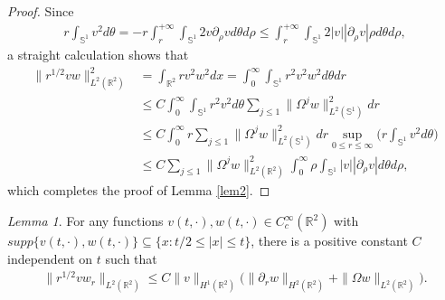 \documentclass[11pt, reqno]{amsart}
\theoremstyle{definition}
\theoremstyle{remark}
\newtheorem{lem}[thm]{Lemma}
\theoremstyle{definition}
\numberwithin{equation}{section}
\numberwithin{equation}{section}
\def\leq{\leqslant}
\begin{document}
\begin{proof}
Since
\begin{align}\label{a1}
r\int_{\mathbb S^1}v^2d\theta=-r\int_r^{+\infty}\int_{\mathbb S^1}2v\partial_{\rho}vd\theta d\rho\leq \int_r^{+\infty}\int_{\mathbb 
S^1}2|v||\partial_{\rho}v|\rho d\theta d\rho,
\end{align}
 a straight calculation shows that
\begin{align*}
\|r^{1/2}vw\|^2_{L^2(\mathbb R^2)}&=\int_{\mathbb
R^2}rv^2w^2dx=\int_0^{\infty}\int_{\mathbb S^1}r^2v^2w^2d\theta dr
\\&\leq C\int_0^{\infty}\int_{\mathbb S^1}r^2v^2d\theta\sum_{j\leq1}\|\Omega^jw\|^2_{L^2(\mathbb S^1)}dr
\\&\leq C\int_0^{\infty}r\sum_{j\leq1}\|\Omega^jw\|^2_{L^2(\mathbb S^1)}dr\sup_{0\leq r\leq\infty}\Big(r\int_{\mathbb S^1}v^2d\theta\Big)
\\&\leq C\sum_{j\leq1}\|\Omega^jw\|^2_{L^2(\mathbb R^2)}\int_0^{\infty}\rho\int_{\mathbb S^1}|v||\partial_{\rho}v|d\theta d\rho,
\end{align*}
which completes the proof of Lemma \ref{lem2}.
\end{proof}
\begin{lem}\label{lem3}
For any functions $v(t,\cdot),w(t,\cdot)\in C_c^{\infty}(\mathbb R^2)$ with
$supp\{v(t,\cdot),w(t,\cdot)\}\subseteq\{x:t/2\leq|x|\leq t\}$,
there is a positive constant $C$ independent on $t$ such that
\begin{align}\label{Y46}
\|r^{1/2}vw_r\|_{L^2(\mathbb R^2)}\leq C\|v\|_{H^1(\mathbb
R^2)}\big(\|\partial_rw\|_{H^2(\mathbb
R^2)}+\|\Omega w\|_{L^2(\mathbb R^2)}\big).
\end{align}
\end{lem}
\end{document}

